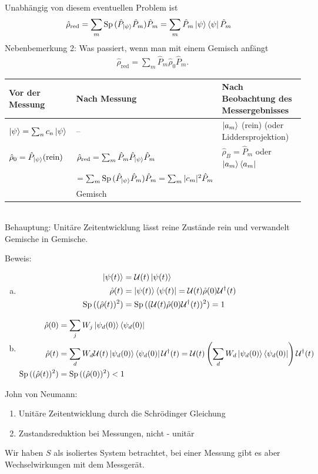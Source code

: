 	Unabhängig von diesem eventuellen Problem ist
		\begin{align*}
			\hat{\rho}_{\text{red}} &= 
			\sum_m \mathrm{Sp}\, (\hat{P}_{\ket{\psi}} \hat{P}_m) \hat{P}_m =
			\sum_m \hat{P}_m \ket{\psi} \bra{\psi} \hat{P}_m 
		\end{align*}
	Nebenbemerkung 2: Was passiert, wenn man mit einem Gemisch anfängt
		\begin{align*}
			\hat{\rho}_{\text{red}} = \sum_m \hat{P}_m \hat{\rho}_0 \hat{P}_m.
		\end{align*}
	\begin{tabular}{l | l | l}
			Vor der Messung & Nach Messung & Nach Beobachtung des Messergebnisses \\
			\hline  
			$\ket{\psi} = \sum_n c_n \ket{\psi}$
			& -- & 
			$\ket{a_m}$ (rein) (oder Liddersprojektion)
			\\
			$\hat{\rho}_0 = \hat{P}_{\ket{\psi}} (\text{rein})$
			&
			$\hat{\rho}_{\text{red}} = \sum_m \hat{P}_m \hat{P}_{\ket{\psi}} \hat{P}_m$
			& 
			$\hat{\rho}_B = \hat{P}_m$ oder $ \ket{a_m }\bra{a_m}$
			\\
			 & 
			$= \sum_m \mathrm{Sp}\,  (\hat{P}_{\ket{\psi}} \hat{P}_m) \hat{P}_m =
			\sum_m |c_m|^2 \hat{P}_m$  
			& 
			\\
			&
			Gemisch
			&
	\end{tabular} \\
	
	Behauptung: Unitäre Zeitentwicklung lässt reine Zustände rein und verwandelt Gemische in Gemische.
	
	Beweis: 
		\begin{enumerate}[(a)]
			\item \begin{align*}
				\ket{\psi (t)} &= \mathcal{U} (t) \ket{\psi(t)} \\
				\hat{\rho}(t) &= \ket{\psi(t)} \bra{\psi (t)} = 
				\mathcal{U} (t) \hat{\rho}(0) \mathcal{U}^\dagger (t) \\
				\mathrm{Sp}\, ((\hat{\rho}(t))^2) &= 
				\mathrm{Sp}\, ((\mathcal{U} (t) \hat{\rho} (0) \mathcal{U}^\dagger(t))^2) = 1 
			\end{align*}
			\item \begin{align*}
				\hat{\rho}(0) &= \sum_j W_j \ket{\psi_d (0)} \bra{\psi_d (0)} \\
				\hat{\rho}(t) &= \sum_d W_d \mathcal{U} (t) \ket{\psi_d (0)} \bra{\psi_d (0)}
				\mathcal{U}^\dagger(t) =
				\mathcal{U}(t) \left(
					\sum_d W_d \ket{\psi_d (0)} \bra{\psi_d (0)}
				\right) \mathcal{U}^\dagger(t) \\
				\mathrm{Sp}\, ((\hat{\rho}(t))^2) &= 
				\mathrm{Sp}\, ((\hat{\rho}(0))^2) < 1
 			\end{align*}
		\end{enumerate}
	John von Neumann:
		\begin{enumerate}[1.]
			\item Unitäre Zeitentwicklung durch die Schrödinger Gleichung
			\item Zustandsreduktion bei Messungen, nicht - unitär
		\end{enumerate}
	Wir haben $S$ als isoliertes System betrachtet, bei einer Messung gibt es aber Wechselwirkungen mit dem Messgerät.
	
